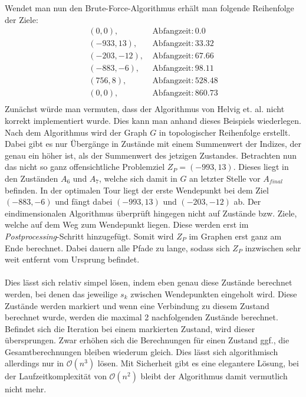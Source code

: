 \documentclass[german,version-2019-11]{uzl-thesis}
\begin{document}
Wendet man nun den Brute-Force-Algorithmus erhält man folgende Reihenfolge der Ziele:
\begin{align*}
(0, 0),~ &\text{Abfangzeit}: 0.0 \\
(-933, 13),~ &\text{Abfangzeit}: 33.32 \\
(-203, -12),~ &\text{Abfangzeit}: 67.66 \\
(-883, -6),~ &\text{Abfangzeit}: 98.11 \\
(756, 8),~ &\text{Abfangzeit}: 528.48 \\
(0, 0),~ &\text{Abfangzeit}: 860.73 \\
\end{align*}
Zunächst würde man vermuten, dass der Algorithmus von Helvig et. al. nicht korrekt implementiert wurde. Dies kann man anhand dieses Beispiels wiederlegen. \\
Nach dem Algorithmus wird der Graph $G$ in topologischer Reihenfolge erstellt. Dabei gibt es nur Übergänge in Zustände mit einem Summenwert der Indizes, der genau ein höher ist, als der Summenwert des jetzigen Zustandes. Betrachten nun das nicht so ganz offensichtliche Problemziel $Z_P=(-993, 13)$. Dieses liegt in den Zuständen $A_6$ und $A_7$, welche sich damit in $G$ an letzter Stelle vor $A_{final}$ befinden. In der optimalen Tour liegt der erste Wendepunkt bei dem Ziel $(-883, -6)$ und fängt dabei $(-993, 13)$ und $(-203,-12)$ ab. Der eindimensionalen Algorithmus überprüft hingegen nicht auf Zustände bzw. Ziele, welche auf dem Weg zum Wendepunkt liegen. Diese werden erst im \emph{Postprocessing}-Schritt hinzugefügt. Somit wird $Z_P$ im Graphen erst ganz am Ende berechnet. Dabei dauern alle Pfade zu lange, sodass sich $Z_P$ inzwischen sehr weit entfernt vom Ursprung befindet. \\\\
Dies lässt sich relativ simpel lösen, indem eben genau diese Zustände berechnet werden, bei denen das jeweilige $s_k$ zwischen Wendepunkten eingeholt wird. Diese Zustände werden markiert und wenn eine Verbindung zu diesem Zustand berechnet wurde, werden die maximal 2 nachfolgenden Zustände berechnet. Befindet sich die Iteration bei einem markierten Zustand, wird dieser übersprungen. Zwar erhöhen sich die Berechnungen für einen Zustand ggf., die Gesamtberechnungen bleiben wiederum gleich. Dies lässt sich algorithmisch allerdings nur in $\mathcal{O}(n^3)$ lösen. Mit Sicherheit gibt es eine elegantere Lösung, bei der Laufzeitkomplexität von $\mathcal{O}(n^2)$ bleibt der Algorithmus damit vermutlich nicht mehr.
\end{document}
